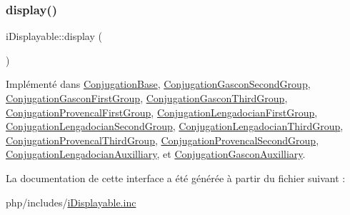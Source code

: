 \subsubsection{\texorpdfstring{display()}{display()}}
{\footnotesize\ttfamily i\+Displayable\+::display (\begin{DoxyParamCaption}{ }\end{DoxyParamCaption})}



Implémenté dans \hyperlink{class_conjugation_base_a7a50c953a3f949a7740d3fb51c4b929d}{Conjugation\+Base}, \hyperlink{class_conjugation_gascon_second_group_a6e3085b2af7792e60d3126709d8c521e}{Conjugation\+Gascon\+Second\+Group}, \hyperlink{class_conjugation_gascon_first_group_ace1bf96e8316a91e65e88f5e1e48c334}{Conjugation\+Gascon\+First\+Group}, \hyperlink{class_conjugation_gascon_third_group_aded79025318b9257b1e78eb56b83408a}{Conjugation\+Gascon\+Third\+Group}, \hyperlink{class_conjugation_provencal_first_group_a6bd7d4bb8434586bf0ac5836a51d0022}{Conjugation\+Provencal\+First\+Group}, \hyperlink{class_conjugation_lengadocian_first_group_adca5561baef16d3a70d8ee40987bc5c0}{Conjugation\+Lengadocian\+First\+Group}, \hyperlink{class_conjugation_lengadocian_second_group_a9d00d6ae2616d21e1cf495ec94c06aa9}{Conjugation\+Lengadocian\+Second\+Group}, \hyperlink{class_conjugation_lengadocian_third_group_a13c6997dad7cbe8c53fe4ecbad7367ab}{Conjugation\+Lengadocian\+Third\+Group}, \hyperlink{class_conjugation_provencal_third_group_a5be367146782812cba9ff8209cf79be2}{Conjugation\+Provencal\+Third\+Group}, \hyperlink{class_conjugation_provencal_second_group_a99d29b0ed4e0e8129dfff0ed94746c4f}{Conjugation\+Provencal\+Second\+Group}, \hyperlink{class_conjugation_lengadocian_auxilliary_a4edf29f1f54605fc5876ff675827672d}{Conjugation\+Lengadocian\+Auxilliary}, et \hyperlink{class_conjugation_gascon_auxilliary_ace722e9b661a8c1ff4ca860682124dd4}{Conjugation\+Gascon\+Auxilliary}.



La documentation de cette interface a été générée à partir du fichier suivant \+:\begin{DoxyCompactItemize}
\item 
php/includes/\hyperlink{i_displayable_8inc}{i\+Displayable.\+inc}\end{DoxyCompactItemize}
